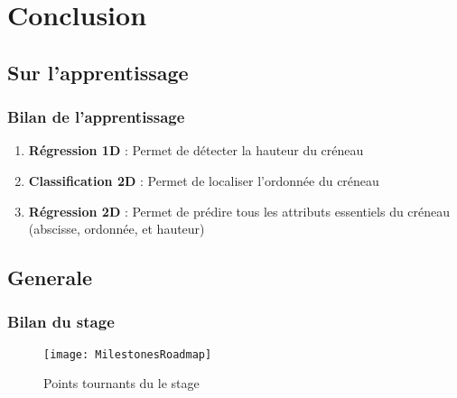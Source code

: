 
% 



\section{Conclusion}

\subsection{Sur l'apprentissage}
\begin{frame}
    \frametitle{Bilan de l'apprentissage}
    \begin{enumerate}
        \item \textbf{Régression 1D} : Permet de détecter la hauteur du créneau %
        \item \textbf{Classification 2D} : Permet de localiser l'ordonnée du créneau %
        \item \textbf{Régression 2D} : Permet de prédire tous les attributs essentiels du créneau (abscisse, ordonnée, et hauteur)%
      \end{enumerate}
\end{frame}

\subsection{Generale}
\begin{frame}
    \frametitle{Bilan du stage}
    \begin{figure}
        \texttt{[image: MilestonesRoadmap]}       
        \caption{Points tournants du le stage}
    \end{figure}
\end{frame}

